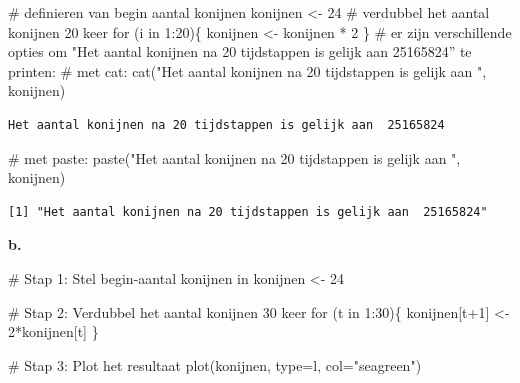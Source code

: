 \documentclass[
  a4paper,
]{scrbook}
\newenvironment{Shaded}{\begin{snugshade}}{\end{snugshade}}
\newcommand{\AttributeTok}[1]{\textcolor[rgb]{0.40,0.45,0.13}{#1}}
\newcommand{\CommentTok}[1]{\textcolor[rgb]{0.37,0.37,0.37}{#1}}
\newcommand{\ControlFlowTok}[1]{\textcolor[rgb]{0.00,0.23,0.31}{#1}}
\newcommand{\DecValTok}[1]{\textcolor[rgb]{0.68,0.00,0.00}{#1}}
\newcommand{\FunctionTok}[1]{\textcolor[rgb]{0.28,0.35,0.67}{#1}}
\newcommand{\NormalTok}[1]{\textcolor[rgb]{0.00,0.23,0.31}{#1}}
\newcommand{\OtherTok}[1]{\textcolor[rgb]{0.00,0.23,0.31}{#1}}
\newcommand{\SpecialCharTok}[1]{\textcolor[rgb]{0.37,0.37,0.37}{#1}}
\newcommand{\StringTok}[1]{\textcolor[rgb]{0.13,0.47,0.30}{#1}}
\theoremstyle{definition}
\theoremstyle{remark}
\begin{document}
\begin{Shaded}
\begin{Highlighting}[]
\CommentTok{\# definieren van begin aantal konijnen}
\NormalTok{konijnen }\OtherTok{\textless{}{-}} \DecValTok{24}
\CommentTok{\# verdubbel het aantal konijnen 20 keer}
\ControlFlowTok{for}\NormalTok{ (i }\ControlFlowTok{in} \DecValTok{1}\SpecialCharTok{:}\DecValTok{20}\NormalTok{)\{ }
\NormalTok{konijnen }\OtherTok{\textless{}{-}}\NormalTok{ konijnen }\SpecialCharTok{*} \DecValTok{2}
\NormalTok{\}}
\CommentTok{\# er zijn verschillende opties om "Het aantal konijnen na 20 tijdstappen is gelijk aan 25165824” te printen:}
\CommentTok{\# met cat:}
\FunctionTok{cat}\NormalTok{(}\StringTok{"Het aantal konijnen na 20 tijdstappen is gelijk aan "}\NormalTok{, konijnen)}
\end{Highlighting}
\end{Shaded}

\begin{verbatim}
Het aantal konijnen na 20 tijdstappen is gelijk aan  25165824
\end{verbatim}

\begin{Shaded}
\begin{Highlighting}[]
\CommentTok{\# met paste:}
\FunctionTok{paste}\NormalTok{(}\StringTok{"Het aantal konijnen na 20 tijdstappen is gelijk aan "}\NormalTok{, konijnen)}
\end{Highlighting}
\end{Shaded}

\begin{verbatim}
[1] "Het aantal konijnen na 20 tijdstappen is gelijk aan  25165824"
\end{verbatim}

\textbf{b.}

\begin{Shaded}
\begin{Highlighting}[]
\CommentTok{\# Stap 1: Stel begin{-}aantal konijnen in}
\NormalTok{konijnen }\OtherTok{\textless{}{-}} \DecValTok{24}

\CommentTok{\# Stap 2: Verdubbel het aantal konijnen 30 keer}
\ControlFlowTok{for}\NormalTok{ (t }\ControlFlowTok{in} \DecValTok{1}\SpecialCharTok{:}\DecValTok{30}\NormalTok{)\{}
\NormalTok{  konijnen[t}\SpecialCharTok{+}\DecValTok{1}\NormalTok{] }\OtherTok{\textless{}{-}} \DecValTok{2}\SpecialCharTok{*}\NormalTok{konijnen[t]}
\NormalTok{\}}

\CommentTok{\# Stap 3: Plot het resultaat}
\FunctionTok{plot}\NormalTok{(konijnen, }\AttributeTok{type=}\StringTok{\textquotesingle{}l\textquotesingle{}}\NormalTok{, }\AttributeTok{col=}\StringTok{"seagreen"}\NormalTok{)}
\end{Highlighting}
\end{Shaded}
\end{document}
